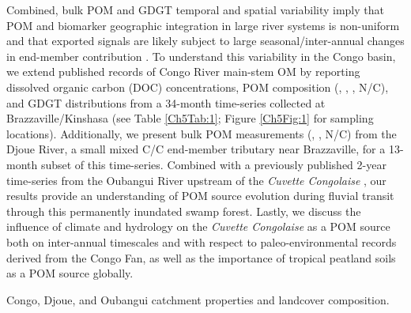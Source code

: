 Combined, bulk POM and GDGT temporal and spatial variability imply that POM and biomarker geographic integration in large river systems is non-uniform and that exported signals are likely subject to large seasonal/inter-annual changes in end-member contribution \citep[\textit{e.g.}][]{Galy:2008jw,Zell:2013eg,Spencer:2016ho}. To understand this variability in the Congo basin, we extend published records of Congo River main-stem OM \citep{Mariotti:1991vx,Coynel:2005cn,Spencer:2012en,Hemingway:2016bq,Spencer:2016ho} by reporting dissolved organic carbon (DOC) concentrations, POM composition (, , , N/C), and GDGT distributions from a 34-month time-series collected at Brazzaville/Kinshasa (see Table \ref{Ch5Tab:1}; Figure \ref{Ch5Fig:1} for sampling locations). Additionally, we present bulk POM measurements (, , N/C) from the Djoue River, a small mixed C/C end-member tributary near Brazzaville, for a 13-month subset of this time-series. Combined with a previously published 2-year time-series from the Oubangui River upstream of the \textit{Cuvette Congolaise} \citep{Bouillon:2012cw,Bouillon:2014ko}, our results provide an understanding of POM source evolution during fluvial transit through this permanently inundated swamp forest. Lastly, we discuss the influence of climate and hydrology on the \textit{Cuvette Congolaise} as a POM source both on inter-annual timescales and with respect to paleo-environmental records derived from the Congo Fan, as well as the importance of tropical peatland soils as a POM source globally.

\begin{table}[ht]
	\caption[Congo, Djoue, and Oubangui catchment properties and landcover composition]{Congo, Djoue, and Oubangui catchment properties and landcover composition.}
	\label{Ch5Tab:1} 
\end{table}

